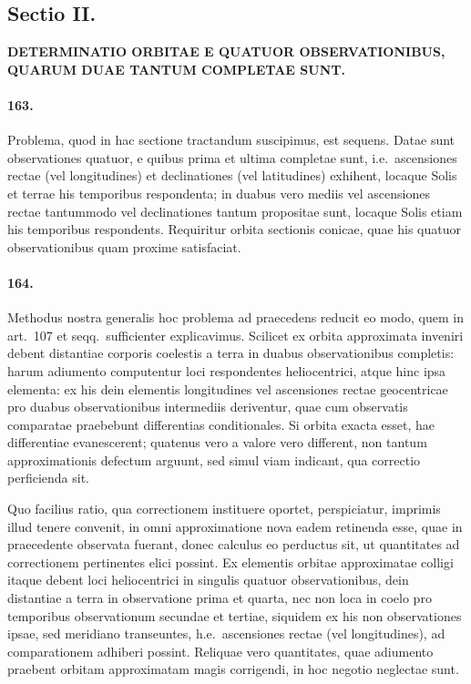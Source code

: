 \documentclass[12pt,a4paper]{article}
\begin{document}
\newpage
\subsection*{Sectio II.}

\begin{center}
\textbf{DETERMINATIO ORBITAE E QUATUOR OBSERVATIONIBUS, QUARUM DUAE TANTUM COMPLETAE SUNT.}
\end{center}

\paragraph{163.}
Problema, quod in hac sectione tractandum suscipimus, est sequens. Datae sunt observationes quatuor, e quibus prima et ultima completae sunt, i.e.~ascensiones rectae (vel longitudines) et declinationes (vel latitudines) exhihent, locaque Solis et terrae his temporibus respondenta; in duabus vero mediis vel ascensiones rectae tantummodo vel declinationes tantum propositae sunt, locaque Solis etiam his temporibus respondents. Requiritur orbita sectionis conicae, quae his quatuor observationibus quam proxime satisfaciat.

\paragraph{164.}
Methodus nostra generalis hoc problema ad praecedens reducit eo modo, quem in art.~107 et seqq.~sufficienter explicavimus. Scilicet ex orbita approximata inveniri debent distantiae corporis coelestis a terra in duabus observationibus completis: harum adiumento computentur loci respondentes heliocentrici, atque hinc ipsa elementa: ex his dein elementis longitudines vel ascensiones rectae geocentricae pro duabus observationibus intermediis deriventur, quae cum observatis comparatae praebebunt differentias conditionales. Si orbita exacta esset, hae differentiae evanescerent; quatenus vero a valore vero different, non tantum approximationis defectum arguunt, sed simul viam indicant, qua correctio perficienda sit.

Quo facilius ratio, qua correctionem instituere oportet, perspiciatur, imprimis illud tenere convenit, in omni approximatione nova eadem retinenda esse, quae in praecedente observata fuerant, donec calculus eo perductus sit, ut quantitates ad correctionem pertinentes elici possint. Ex elementis orbitae approximatae colligi itaque debent loci heliocentrici in singulis quatuor observationibus, dein distantiae a terra in observatione prima et quarta, nec non loca in coelo pro temporibus observationum secundae et tertiae, siquidem ex his non observationes ipsae, sed meridiano transeuntes, h.e.~ascensiones rectae (vel longitudines), ad comparationem adhiberi possint. Reliquae vero quantitates, quae adiumento praebent orbitam approximatam magis corrigendi, in hoc negotio neglectae sunt.
\end{document}
